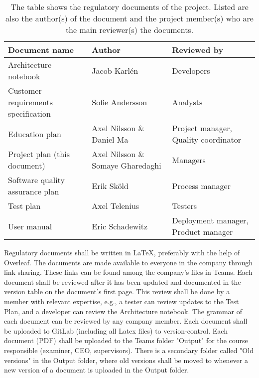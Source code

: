 \begingroup
\begin{table}[ht]
    \renewcommand{\arraystretch}{1.5}
    \captionsetup{font=small,labelfont=small}
    {\footnotesize
        \begin{tabular}{|M{4.5cm}|M{4cm}|M{5cm}|}
            \hline
            \textbf{Document name} & \textbf{Author} & \textbf{Reviewed by}\\
            \hline
            Architecture notebook & Jacob Karlén & Developers\\
            \hline
            Customer requirements specification & Sofie Andersson & Analysts\\
            \hline
            Education plan & Axel Nilsson \& Daniel Ma & Project manager, Quality coordinator\\
            \hline
            Project plan (this document) & Axel Nilsson \& Somaye Gharedaghi & Managers\\
            \hline
            Software quality assurance plan & Erik Sköld & Process manager\\
            \hline
            Test plan & Axel Telenius & Testers\\
            \hline
            User manual & Eric Schadewitz & Deployment manager, Product manager\\
            \hline
        \end{tabular}
        \caption{The table shows the regulatory documents of the project. Listed are also the author(s) of the document and the project member(s) who are the main reviewer(s) the documents.}
        \label{tab: documents}
    }
\end{table}

Regulatory documents shall be written in LaTeX, preferably with the help of Overleaf. The documents are made available to everyone in the company through link sharing. These links can be found among the company's files in Teams. Each document shall be reviewed after it has been updated and documented in the version table on the document's first page. This review shall be done by a member with relevant expertise, e.g., a tester can review updates to the Test Plan, and a developer can review the Architecture notebook. The grammar of each document can be reviewed by any company member. Each document shall be uploaded to GitLab (including all Latex files) to version-control. Each document (PDF) shall be uploaded to the Teams folder "Output" for the course responsible (examiner, CEO, supervisors). There is a secondary folder called "Old versions" in the Output folder, where old versions shall be moved to whenever a new version of a document is uploaded in the Output folder. 

